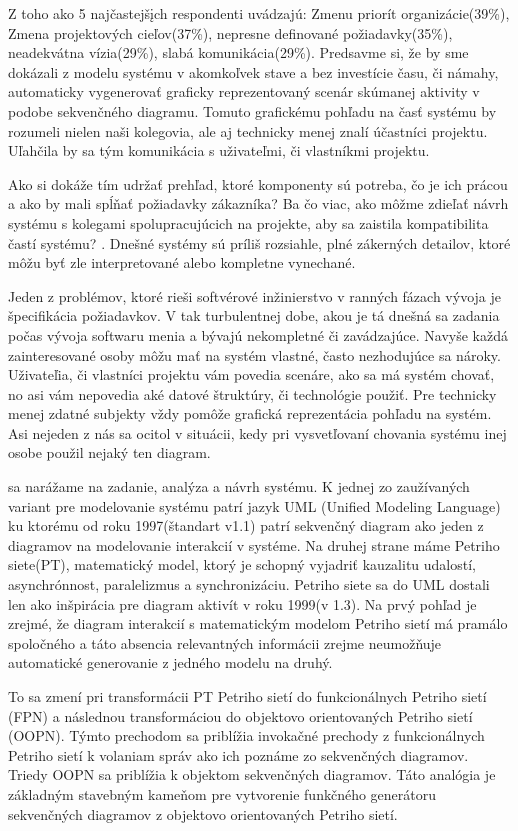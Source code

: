 Z toho ako 5 najčastejšįch respondenti uvádzajú: Zmenu priorít organizácie(39\%), Zmena projektových cieľov(37\%), nepresne definované požiadavky(35\%), neadekvátna vízia(29\%), slabá komunikácia(29\%).
Predsavme si, že by sme dokázali z modelu systému v akomkoľvek stave a bez investície času, či námahy, automaticky vygenerovať graficky reprezentovaný scenár skúmanej aktivity v podobe sekvenčného diagramu. Tomuto grafickému pohľadu na časť systému by rozumeli nielen naši kolegovia, ale aj technicky menej znalí účastníci projektu. Uľahčila by sa tým komunikácia s uživateľmi, či vlastníkmi projektu.

Ako si dokáže tím udržať prehľad, ktoré komponenty sú potreba, čo je ich prácou a ako by mali spĺňať požiadavky zákazníka? Ba čo viac, ako môžme zdieľať návrh systému s kolegami spolupracujúcich na projekte, aby sa zaistila kompatibilita častí systému?  \cite{hamilton2006learning}. Dnešné systémy sú príliš rozsiahle, plné zákerných detailov, ktoré môžu byť zle interpretované alebo kompletne vynechané.

Jeden z problémov, ktoré rieši softvérové inžinierstvo v ranných fázach vývoja je špecifikácia požiadavkov. V tak turbulentnej dobe, akou je tá dnešná sa zadania počas vývoja softwaru menia a bývajú nekompletné či zavádzajúce. Navyše každá zainteresované osoby môžu mať na systém vlastné, často nezhodujúce sa nároky. Uživateľia, či vlastníci projektu vám povedia scenáre, ako sa má systém chovať, no asi vám nepovedia aké datové štruktúry, či technológie použiť. Pre technicky menej zdatné subjekty vždy pomôže grafická reprezentácia pohľadu na systém. Asi nejeden z nás sa ocitol v situácii, kedy pri vysvetľovaní chovania systému inej osobe použil nejaký ten diagram. 

 sa narážame na zadanie, analýza a návrh systému. K jednej zo zaužívaných variant pre modelovanie systému patrí jazyk UML (Unified Modeling Language) ku ktorému od roku 1997(štandart v1.1) patrí sekvenčný diagram ako jeden z diagramov na modelovanie interakcií v systéme. Na druhej strane máme Petriho siete(PT), matematický model, ktorý je schopný vyjadriť kauzalitu udalostí, asynchrónnost, paralelizmus a synchronizáciu. Petriho siete sa do UML dostali len ako inšpirácia pre diagram aktivít v roku 1999(v 1.3). Na prvý pohľad je zrejmé, že diagram interakcií s matematickým modelom Petriho sietí má pramálo spoločného a táto absencia relevantných informácii zrejme neumožňuje automatické generovanie z jedného modelu na druhý. 

To sa zmení pri transformácii PT Petriho sietí do  funkcionálnych Petriho sietí (FPN) a následnou transformáciou do objektovo orientovaných Petriho sietí (OOPN). Týmto prechodom sa priblížia invokačné prechody z funkcionálnych Petriho sietí k volaniam správ ako ich poznáme zo sekvenčných diagramov. Triedy OOPN sa priblížia k objektom sekvenčných diagramov. Táto analógia je základným stavebným kameňom pre vytvorenie funkčného generátoru sekvenčných diagramov z objektovo orientovaných Petriho sietí.

